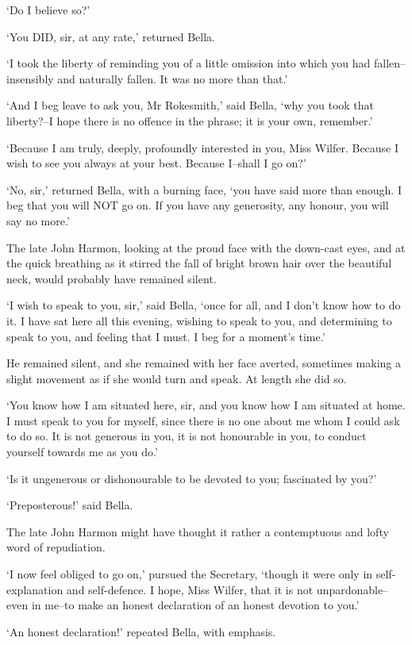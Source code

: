 ‘Do I believe so?’

‘You DID, sir, at any rate,’ returned Bella.

‘I took the liberty of reminding you of a little omission into which you
had fallen--insensibly and naturally fallen. It was no more than that.’

‘And I beg leave to ask you, Mr Rokesmith,’ said Bella, ‘why you took
that liberty?--I hope there is no offence in the phrase; it is your own,
remember.’

‘Because I am truly, deeply, profoundly interested in you, Miss Wilfer.
Because I wish to see you always at your best. Because I--shall I go
on?’

‘No, sir,’ returned Bella, with a burning face, ‘you have said more than
enough. I beg that you will NOT go on. If you have any generosity, any
honour, you will say no more.’

The late John Harmon, looking at the proud face with the down-cast eyes,
and at the quick breathing as it stirred the fall of bright brown hair
over the beautiful neck, would probably have remained silent.

‘I wish to speak to you, sir,’ said Bella, ‘once for all, and I don’t
know how to do it. I have sat here all this evening, wishing to speak to
you, and determining to speak to you, and feeling that I must. I beg for
a moment’s time.’

He remained silent, and she remained with her face averted, sometimes
making a slight movement as if she would turn and speak. At length she
did so.

‘You know how I am situated here, sir, and you know how I am situated
at home. I must speak to you for myself, since there is no one about
me whom I could ask to do so. It is not generous in you, it is not
honourable in you, to conduct yourself towards me as you do.’

‘Is it ungenerous or dishonourable to be devoted to you; fascinated by
you?’

‘Preposterous!’ said Bella.

The late John Harmon might have thought it rather a contemptuous and
lofty word of repudiation.

‘I now feel obliged to go on,’ pursued the Secretary, ‘though it were
only in self-explanation and self-defence. I hope, Miss Wilfer, that
it is not unpardonable--even in me--to make an honest declaration of an
honest devotion to you.’

‘An honest declaration!’ repeated Bella, with emphasis.

